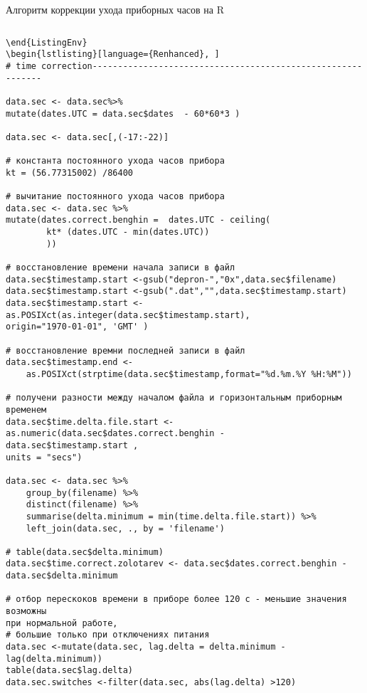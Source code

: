 
\begin{ListingEnv}[H]	
	\caption{Алгоритм коррекции ухода 
		приборных часов на R}

	\label{list:timecor}
	\begin{lstlisting}[language={Renhanced}, ]
	\end{lstlisting}
\end{ListingEnv}
\begin{lstlisting}[language={Renhanced}, ]
\end{ListingEnv}
\begin{lstlisting}[language={Renhanced}, ]
# time correction------------------------------------------------------------

data.sec <- data.sec%>%
mutate(dates.UTC = data.sec$dates  - 60*60*3 )

data.sec <- data.sec[,(-17:-22)]

# константа постоянного ухода часов прибора
kt = (56.77315002) /86400

# вычитание постоянного ухода часов прибора
data.sec <- data.sec %>%
mutate(dates.correct.benghin =  dates.UTC - ceiling(
		kt* (dates.UTC - min(dates.UTC))
		))

# восстановление времени начала записи в файл
data.sec$timestamp.start <-gsub("depron-","0x",data.sec$filename)
data.sec$timestamp.start <-gsub(".dat","",data.sec$timestamp.start)
data.sec$timestamp.start <- as.POSIXct(as.integer(data.sec$timestamp.start), 
origin="1970-01-01", 'GMT' )

# восстановление времни последней записи в файл
data.sec$timestamp.end <- 
	as.POSIXct(strptime(data.sec$timestamp,format="%d.%m.%Y %H:%M"))

# получени разности между началом файла и горизонтальным приборным временем
data.sec$time.delta.file.start <- as.numeric(data.sec$dates.correct.benghin - 
data.sec$timestamp.start ,
units = "secs") 

data.sec <- data.sec %>%
	group_by(filename) %>%
	distinct(filename) %>%
	summarise(delta.minimum = min(time.delta.file.start)) %>%
	left_join(data.sec, ., by = 'filename')

# table(data.sec$delta.minimum)
data.sec$time.correct.zolotarev <- data.sec$dates.correct.benghin - 
data.sec$delta.minimum 

# отбор перескоков времени в приборе более 120 с - меньшие значения возможны 
при нормальной работе, 
# большие только при отключениях питания
data.sec <-mutate(data.sec, lag.delta = delta.minimum - lag(delta.minimum))
table(data.sec$lag.delta)
data.sec.switches <-filter(data.sec, abs(lag.delta) >120)


\end{lstlisting}
